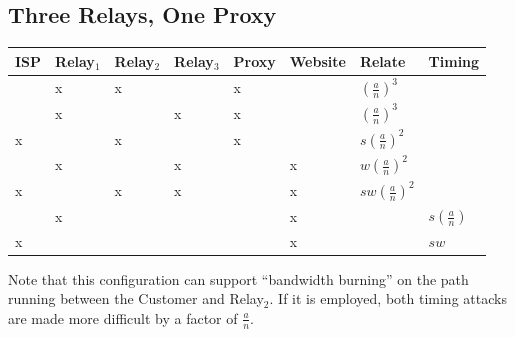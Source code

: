 \documentclass{article}
\begin{document}
\subsection{Three Relays, One Proxy}


\begin{center}
\begin{tabular}{l | l | l | l | l | l | l | l}
  ISP & Relay$_1$ & Relay$_2$ & Relay$_3$ & Proxy & Website & Relate             & Timing \\
  \hline
      & x         & x         &           & x     &         & $(\frac{a}{n})^3$  & \\
  \hline
      & x         &           & x         & x     &         & $(\frac{a}{n})^3$  & \\
  \hline
  x   &           & x         &           & x     &         & $s(\frac{a}{n})^2$ & \\
  \hline
      & x         &           & x         &       & x       & $w(\frac{a}{n})^2$ & \\
  \hline
  x   &           & x         & x         &       & x       & $sw(\frac{a}{n})^2$ & \\
  \hline
      & x         &           &           &       & x       &                    & $s(\frac{a}{n})$ \\
  \hline
  x   &           &           &           &       & x       &                    & $sw$ \\
\end{tabular}
\end{center}

Note that this configuration can support ``bandwidth burning'' on the
path running between the Customer and Relay$_2$. If it is employed,
both timing attacks are made more difficult by a factor of
$\frac{a}{n}$.

\end{document}
